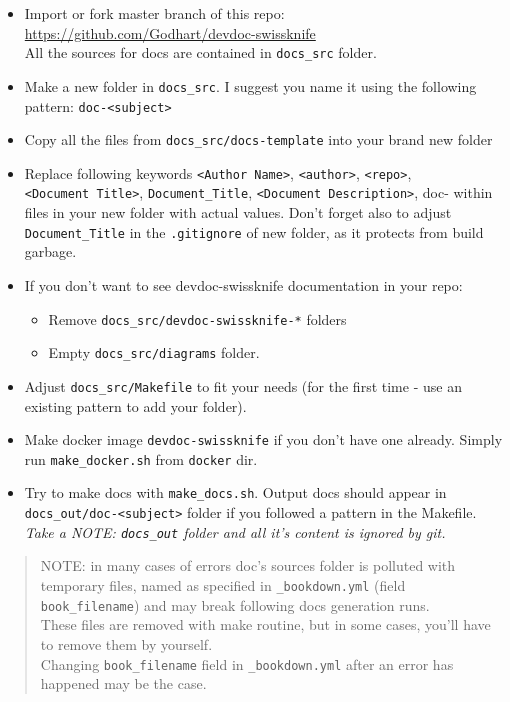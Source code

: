 \documentclass[12pt,a4paper,12pt,oneside,openany]{book}
\providecommand{\tightlist}{%
  \setlength{\itemsep}{0pt}\setlength{\parskip}{0pt}}
\begin{document}
\begin{itemize}
\item
  Import or fork master branch of this repo: \url{https://github.com/Godhart/devdoc-swissknife}\\
  All the sources for docs are contained in \texttt{docs\_src} folder.
\item
  Make a new folder in \texttt{docs\_src}. I suggest you name it using the following pattern: \texttt{doc-\textless{}subject\textgreater{}}
\item
  Copy all the files from \texttt{docs\_src/docs-template} into your brand new folder
\item
  Replace following keywords \texttt{\textless{}Author\ Name\textgreater{}}, \texttt{\textless{}author\textgreater{}}, \texttt{\textless{}repo\textgreater{}}, \texttt{\textless{}Document\ Title\textgreater{}}, \texttt{Document\_Title}, \texttt{\textless{}Document\ Description\textgreater{}}, doc- within files in your new folder with actual values. Don't forget also to adjust \texttt{Document\_Title} in the \texttt{.gitignore} of new folder, as it protects from build garbage.
\item
  If you don't want to see devdoc-swissknife documentation in your repo:

  \begin{itemize}
  \tightlist
  \item
    Remove \texttt{docs\_src/devdoc-swissknife-*} folders
  \item
    Empty \texttt{docs\_src/diagrams} folder.
  \end{itemize}
\item
  Adjust \texttt{docs\_src/Makefile} to fit your needs (for the first time - use an existing pattern to add your folder).
\item
  Make docker image \texttt{devdoc-swissknife} if you don't have one already. Simply run \texttt{make\_docker.sh} from \texttt{docker} dir.
\item
  Try to make docs with \texttt{make\_docs.sh}. Output docs should appear in \texttt{docs\_out/doc-\textless{}subject\textgreater{}} folder if you followed a pattern in the Makefile.\\
  \emph{Take a NOTE: \texttt{docs\_out} folder and all it's content is ignored by git.}
\end{itemize}

\begin{quote}
NOTE: in many cases of errors doc's sources folder is polluted with temporary files, named as specified in \texttt{\_bookdown.yml} (field \texttt{book\_filename}) and may break following docs generation runs.\\
These files are removed with make routine, but in some cases, you'll have to remove them by yourself.\\
Changing \texttt{book\_filename} field in \texttt{\_bookdown.yml} after an error has happened may be the case.
\end{quote}
\end{document}
